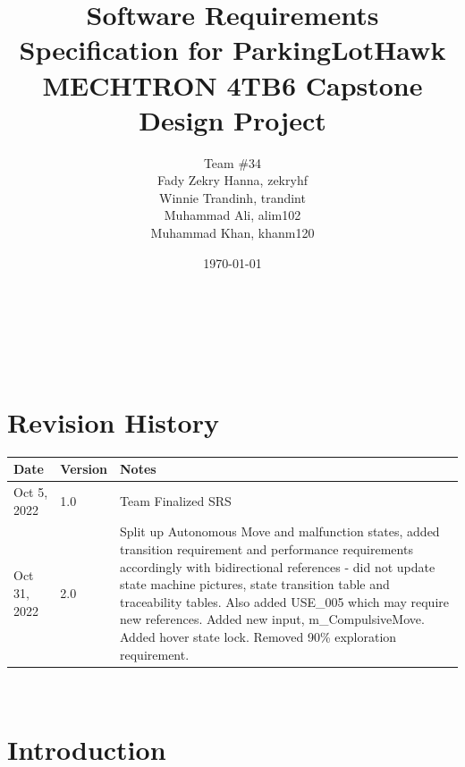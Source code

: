 \documentclass{article}
\begin{document}
\title{
Software Requirements Specification for ParkingLotHawk \\
  \large MECHTRON 4TB6 Capstone Design Project 
    }

\author{\authname Team \#34 \\
Fady Zekry Hanna, zekryhf \\
Winnie Trandinh, trandint \\
Muhammad Ali, alim102 \\
Muhammad Khan, khanm120}

\date{\today}
	
\maketitle

~\newpage


\tableofcontents

~\newpage

\section*{Revision History}

\begin{tabularx}{\textwidth}{p{3cm}p{2cm}X} 
\toprule {\bf Date} & {\bf Version} & {\bf Notes}\\
\midrule
Oct 5, 2022 & 1.0 & Team Finalized SRS\\

\bottomrule
Oct 31, 2022 & 2.0 & Split up Autonomous Move and malfunction states, added transition requirement and performance requirements accordingly with bidirectional references - did not update state machine pictures, state transition table and traceability tables. Also added USE\_005 which may require new references. Added new input, m\_CompulsiveMove. Added hover state lock. Removed 90\% exploration requirement. 
\\

\bottomrule
\end{tabularx}

~\newpage


\section{Introduction}
\label{sec:Intro}
\end{document}
